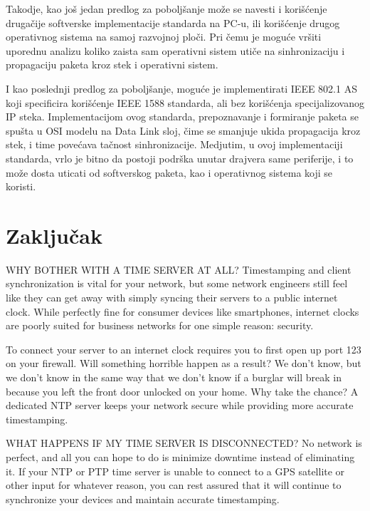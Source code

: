 \documentclass[a4paper,12pt, master]{etf}
\begin{document}
	Takodje, kao jo\v{s} jedan predlog za pobolj\v{s}anje mo\v{z}e se navesti i 
	kori\v{s}\'{c}enje druga\v{c}ije softverske implementacije standarda na 
	PC-u, ili kori\v{s}\'{c}enje drugog operativnog sistema na samoj razvojnoj 
	plo\v{c}i. Pri \v{c}emu je mogu\'{c}e vr\v{s}iti uporednu analizu koliko 
	zaista sam operativni sistem uti\v{c}e na sinhronizaciju i propagaciju 
	paketa kroz stek i operativni sistem.

	I kao poslednji predlog za pobolj\v{s}anje, mogu\'{c}e je implementirati 
	IEEE 802.1 AS koji specificira kori\v{s}\'{c}enje IEEE 1588 standarda, ali 
	bez kori\v{s}\'{c}enja specijalizovanog IP steka. Implementacijom ovog 
	standarda, prepoznavanje i formiranje paketa se spu\v{s}ta u OSI modelu na 
	Data Link sloj, \v{c}ime se smanjuje ukida propagacija kroz stek, i time 
	pove\'{c}ava ta\v{c}nost sinhronizacije. Medjutim, u ovoj implementaciji 
	standarda, vrlo je bitno da postoji podr\v{s}ka unutar drajvera same 
	periferije, i to mo\v{z}e dosta uticati od softverskog paketa, kao i 
	operativnog sistema koji se koristi.

	\newpage

	\chapter{Zaključak}

	WHY BOTHER WITH A TIME SERVER AT ALL\@?
	Timestamping and client synchronization is vital for your network, but some network
	engineers still feel like they can get away with simply syncing their servers to a public
	internet clock. While perfectly fine for consumer devices like smartphones, internet
	clocks are poorly suited for business networks for one simple reason: security.

	To connect your server to an internet clock requires you to first open up port 123 on
	your firewall. Will something horrible happen as a result? We don't know, but we don't
	know in the same way that we don't know if a burglar will break in because you left the
	front door unlocked on your home. Why take the chance? A dedicated NTP server keeps your
	network secure while providing more accurate timestamping.

	WHAT HAPPENS IF MY TIME SERVER IS DISCONNECTED\@?
	No network is perfect, and all you can hope to do is minimize downtime instead of
	eliminating it. If your NTP or PTP time server is unable to connect to a GPS satellite or
	other input for whatever reason, you can rest assured that it will continue to
	synchronize your devices and maintain accurate timestamping.
\end{document}
